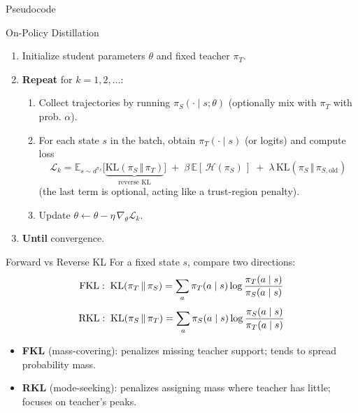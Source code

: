 \documentclass[10pt,aspectratio=169]{beamer}
\begin{document}
\begin{frame}{Pseudocode}
\small
\begin{block}{On-Policy Distillation}
\begin{enumerate}
  \item Initialize student parameters $\theta$ and fixed teacher $\pi_T$.
  \item \textbf{Repeat} for $k=1,2,\dots$:
  \begin{enumerate}
    \item Collect trajectories by running $\pi_S(\cdot\mid s;\theta)$ (optionally mix with $\pi_T$ with prob. $\alpha$).
    \item For each state $s$ in the batch, obtain $\pi_T(\cdot\mid s)$ (or logits) and compute loss
    \[
      \mathcal{L}_k = \mathbb{E}_{s\sim d^{\pi_S}}\big[\underbrace{\mathrm{KL}(\pi_S\,\Vert\,\pi_T)}_{\text{reverse KL}}\big]
      \; + \; \beta\,\mathbb{E}[\,\mathcal{H}(\pi_S)\,] \; + \; \lambda\,\mathrm{KL}(\pi_S\,\Vert\,\pi_{S,\text{old}})
    \]
    (the last term is optional, acting like a trust-region penalty).
    \item Update $\theta \leftarrow \theta - \eta\,\nabla_\theta \mathcal{L}_k$.
  \end{enumerate}
  \item \textbf{Until} convergence.
\end{enumerate}
\end{block}
\end{frame}

\begin{frame}{Forward vs Reverse KL}
  For a fixed state $s$, compare two directions:
  \[\small
    \mathrm{FKL}:\; \mathrm{KL}(\pi_T\,\Vert\,\pi_S) 
    = \sum_a \pi_T(a\mid s)\log\frac{\pi_T(a\mid s)}{\pi_S(a\mid s)}
  \]
  \[\small
    \mathrm{RKL}:\; \mathrm{KL}(\pi_S\,\Vert\,\pi_T) 
    = \sum_a \pi_S(a\mid s)\log\frac{\pi_S(a\mid s)}{\pi_T(a\mid s)}
  \]
  \vspace{1mm}
  \begin{itemize}
    \item \textbf{FKL} (mass-covering): penalizes missing teacher support; tends to spread probability mass.
    \item \textbf{RKL} (mode-seeking): penalizes assigning mass where teacher has little; focuses on teacher's peaks.
  \end{itemize}
\end{frame}
\end{document}
